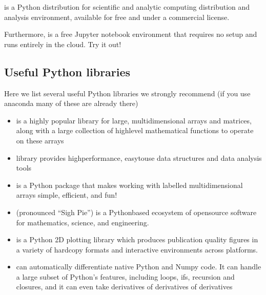 \documentclass[letterpaper,10pt,english]{sphinxmanual}
\begin{document}
is a Python
distribution for scientific and analytic computing distribution and
analysis environment, available for free and under a commercial
license.

Furthermore,  is a free Jupyter notebook environment that requires
no setup and runs entirely in the cloud. Try it out!


\subsection{Useful Python libraries}
\label{\detokenize{chapter3:useful-python-libraries}}
Here we list several useful Python libraries we strongly recommend (if you use anaconda many of these are already there)
\begin{itemize}
\item {} 
 is a highly popular library for large, multi\sphinxhyphen{}dimensional arrays and matrices, along with a large collection of high\sphinxhyphen{}level mathematical functions to operate on these arrays

\item {} 
 library provides high\sphinxhyphen{}performance, easy\sphinxhyphen{}to\sphinxhyphen{}use data structures and data analysis tools

\item {} 
 is a Python package that makes working with labelled multi\sphinxhyphen{}dimensional arrays simple, efficient, and fun!

\item {} 
 (pronounced “Sigh Pie”) is a Python\sphinxhyphen{}based ecosystem of open\sphinxhyphen{}source software for mathematics, science, and engineering.

\item {} 
 is a Python 2D plotting library which produces publication quality figures in a variety of hardcopy formats and interactive environments across platforms.

\item {} 
 can automatically differentiate native Python and Numpy code. It can handle a large subset of Python’s features, including loops, ifs, recursion and closures, and it can even take derivatives of derivatives of derivatives


\end{itemize}
\end{document}
